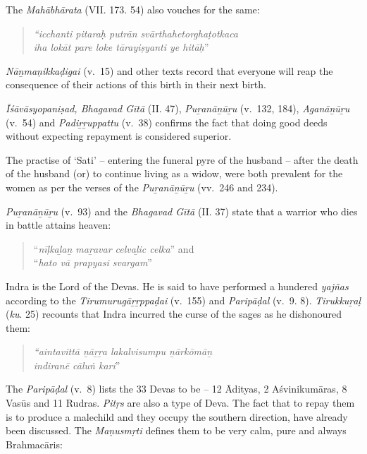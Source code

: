 The \textit{Mahābhārata} (VII. 173. 54) also vouches for the same:

\begin{quote}
\textit{“icchanti pitaraḥ putrān svārthahetorghaṭotkaca}\\\textit{iha lokāt pare loke tārayiṣyanti ye hitāḥ}”
\end{quote}

\textit{Nāṉmaṇikkaḍigai} (v.~15) and other texts record that everyone will reap the consequence of their actions of this birth in their next birth.

\textit{Īśāvāsyopaniṣad, Bhagavad Gītā} (II. 47), \textit{Puṟanāṉūṟu} (v.\ 132, 184), \textit{Aganāṉūṟu \\} (v.~54) and \textit{Padiṟṟuppattu} (v.~38) confirms the fact that doing good deeds without expecting repayment is considered superior.

The practise of ‘Sati’ – entering the funeral pyre of the husband – after the death of the husband (or) to continue living as a widow, were both prevalent for the women as per the verses of the \textit{Puṟanāṉūṟu} (vv.~246 and 234).

\textit{Puṟanāṉūṟu} (v.~93) and the \textit{Bhagavad Gītā} (II. 37) state that a warrior who dies in battle attains heaven:

\begin{quote}
“\textit{nīḷkaḻaṉ maṟavar celvaḻic celka}” and \\ “\textit{hato vā prapyasi svargam}”
\end{quote}

Indra is the Lord of the Devas. He is said to have performed a hundered \textit{yajñas} according to the \textit{Tirumurugāṟṟppaḍai} (v.~155) and \textit{Paripāḍal} (v.~9. 8). \textit{Tirukkuṟaḷ} (\textit{ku}. 25) recounts that Indra incurred the curse of the sages as he dishonoured them:

\begin{quote}
\textit{“aintavittā ṉāṟṟa lakalvisumpu ṉārkōmāṉ}\\\textit{indiranē cāluṅ kari}”
\end{quote}

The \textit{Paripāḍal} (v.~8) lists the 33 Devas to be – 12 Ādityas, 2 Aśvinikumāras, 8 Vasūs and 11 Rudras. \textit{Pitṛs} are also a type of Deva. The fact that to repay them is to produce a malechild and they occupy the southern direction, have already been discussed. The \textit{Maṇusmṛti} defines them to be very calm, pure and always Brahmacāris:


